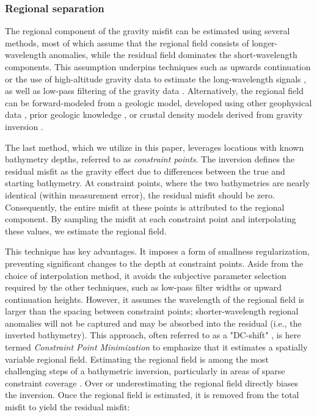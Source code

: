 \documentclass[tc, manuscript]{copernicus}
\begin{document}
\subsubsection{Regional separation}
The regional component of the gravity misfit can be estimated using several methods, most of which assume that the regional field consists of longer-wavelength anomalies, while the residual field dominates the short-wavelength components. This assumption underpins techniques such as upwards continuation or the use of high-altitude gravity data to estimate the long-wavelength signals \citep[e.g.][]{tintobathymetry2015, mutosubglacial2016}, as well as low-pass filtering of the gravity data \citep[e.g.][]{eisermannbathymetry2020}. Alternatively, the regional field can be forward-modeled from a geologic model, developed using other geophysical data \citep{hodgsonfuture2019}, prior geologic knowledge \citep{tintoprogressive2011}, or crustal density models derived from gravity inversion \citep{tintoross2019, cochrandetailed2020, anbathymetry2019}.

The last method, which we utilize in this paper, leverages locations with known bathymetry depths, referred to as \textit{constraint points}. The inversion defines the residual misfit as the gravity effect due to differences between the true and starting bathymetry. At constraint points, where the two bathymetries are nearly identical (within measurement error), the residual misfit should be zero. Consequently, the entire misfit at these points is attributed to the regional component. By sampling the misfit at each constraint point and interpolating these values, we estimate the regional field.

This technique has key advantages. It imposes a form of smallness regularization, preventing significant changes to the depth at constraint points. Aside from the choice of interpolation method, it avoids the subjective parameter selection required by the other techniques, such as low-pass filter widths or upward continuation heights. However, it assumes the wavelength of the regional field is larger than the spacing between constraint points; shorter-wavelength regional anomalies will not be captured and may be absorbed into the residual (i.e., the inverted bathymetry). This approach, often referred to as a "DC-shift" \citep{millanconstraining2020, yangbathymetry2021, anbathymetry2019}, is here termed \textit{Constraint Point Minimization} to emphasize that it estimates a spatially variable regional field. Estimating the regional field is among the most challenging steps of a bathymetric inversion, particularly in areas of sparse constraint coverage \citep{brisbourneseabed2014}. Over or underestimating the regional field directly biases the inversion. Once the regional field is estimated, it is removed from the total misfit to yield the residual misfit:
\end{document}
